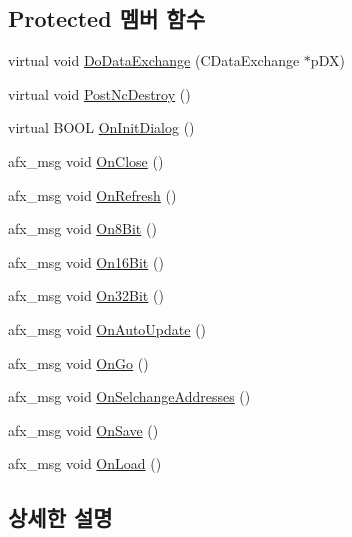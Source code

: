 \subsection*{Protected 멤버 함수}
\begin{DoxyCompactItemize}
\item 
virtual void \mbox{\hyperlink{class_g_b_memory_viewer_dlg_a124868a573da84a7958c38409059bde3}{Do\+Data\+Exchange}} (C\+Data\+Exchange $\ast$p\+DX)
\item 
virtual void \mbox{\hyperlink{class_g_b_memory_viewer_dlg_a5c0847f6b059bc27ccf18ae85ebe249a}{Post\+Nc\+Destroy}} ()
\item 
virtual B\+O\+OL \mbox{\hyperlink{class_g_b_memory_viewer_dlg_a17f1561370d3e56e71044555399dc8de}{On\+Init\+Dialog}} ()
\item 
afx\+\_\+msg void \mbox{\hyperlink{class_g_b_memory_viewer_dlg_aff8b13af0ecd94d5ef812dbfcb73728a}{On\+Close}} ()
\item 
afx\+\_\+msg void \mbox{\hyperlink{class_g_b_memory_viewer_dlg_a06c19ee769949ce93010ff891bcac340}{On\+Refresh}} ()
\item 
afx\+\_\+msg void \mbox{\hyperlink{class_g_b_memory_viewer_dlg_a3e6f7abe8cf8dbc567d662eb33cf569b}{On8\+Bit}} ()
\item 
afx\+\_\+msg void \mbox{\hyperlink{class_g_b_memory_viewer_dlg_a52b3f9fedab4314bd634becf88c756a2}{On16\+Bit}} ()
\item 
afx\+\_\+msg void \mbox{\hyperlink{class_g_b_memory_viewer_dlg_a4e97f32250cfe77d1381fb21eed6daa4}{On32\+Bit}} ()
\item 
afx\+\_\+msg void \mbox{\hyperlink{class_g_b_memory_viewer_dlg_a7c7da28ae22f8a9f5f8ad3e6bb358949}{On\+Auto\+Update}} ()
\item 
afx\+\_\+msg void \mbox{\hyperlink{class_g_b_memory_viewer_dlg_ade5919e22370d16bb0457a79f81d5877}{On\+Go}} ()
\item 
afx\+\_\+msg void \mbox{\hyperlink{class_g_b_memory_viewer_dlg_a4e089b7216a76ba514f26f061f53fd8c}{On\+Selchange\+Addresses}} ()
\item 
afx\+\_\+msg void \mbox{\hyperlink{class_g_b_memory_viewer_dlg_abea90b70d9579272367ed561fe796b01}{On\+Save}} ()
\item 
afx\+\_\+msg void \mbox{\hyperlink{class_g_b_memory_viewer_dlg_ac81a1ae7e069e1db594879cddbd7b6d8}{On\+Load}} ()
\end{DoxyCompactItemize}


\subsection{상세한 설명}


